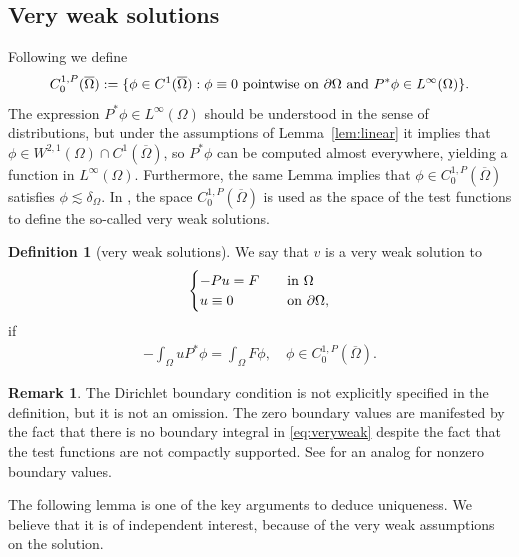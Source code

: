 \documentclass[12pt,a4paper]{amsart}
\theoremstyle{definition}
\newtheorem{remark}[theorem]{\bf Remark}
\newtheorem{definition}[theorem]{\bf Definition}
\begin{document}
\subsection{Very weak solutions}

Following \cite{MR2103694} we define
\begin{equation}\label{c1cl}
    C^{1,P}_0(\overline{\Omega}):= \{ \phi\in C^1(\overline{\Omega}): \phi\equiv 0 \ \textnormal{pointwise on}\ \partial\Omega \ {\rm and}\ P^*\phi \in L^\infty (\Omega)\}.   
\end{equation}
The expression $P^*\phi \in L^\infty(\Omega)$ should be understood in the sense of distributions, but under the assumptions of Lemma~\ref{lem:linear} it implies that $\phi \in W^{2,1}(\Omega) \cap C^1(\overline{\Omega}) $, so $P^*\phi$ can be computed almost everywhere, yielding a function in $L^\infty(\Omega)$. Furthermore, the same Lemma implies that $\phi \in C^{1,P}_0(\overline{\Omega})$ satisfies $\phi \lesssim \delta_{\Omega}$. In \cite[Definition~2.3]{MR2103694}, the space $C^{1,P}_0(\overline{\Omega})$ is used as the space of the test functions to define the so-called very weak solutions. 

\begin{definition}[very weak solutions]\label{very-weak}
    We say that $v$ is a very weak solution to 
    \begin{align*}
        \begin{cases}
            -Pu = F\quad &{\rm in}\ \Omega\\
            u\equiv 0\quad &{\rm on}\ \partial \Omega,
        \end{cases}
    \end{align*}
    if \begin{align}\label{eq:veryweak}
        -\int_\Omega u P^*\phi = \int_\Omega F \phi,\quad \phi \in C^{1,P}_0(\overline{\Omega}).
    \end{align}
\end{definition}

\begin{remark}
    The Dirichlet boundary condition is not explicitly specified in the definition, but it is not an omission. The zero boundary values are manifested by the fact that there is no boundary integral in \eqref{eq:veryweak} despite the fact that the test functions are not compactly supported. See \cite[Definition~2.3]{MR2103694} for an analog for nonzero boundary values. 
\end{remark}

The following lemma is one of the key arguments to deduce uniqueness. We believe that it is of independent interest, because of the very weak assumptions on the solution.
\end{document}

